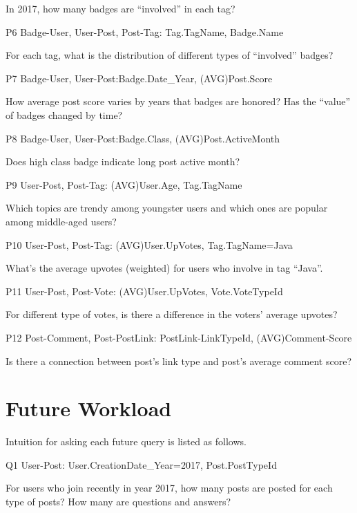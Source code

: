 \documentclass[letterpaper,12pt,titlepage,oneside,final]{book}
\begin{document}
In 2017, how many badges are ``involved'' in each tag? 

P6 \hspace{3mm} Badge-User, User-Post, Post-Tag: Tag.TagName, Badge.Name

For each tag, what is the distribution of different types of ``involved'' badges?

P7 \hspace{3mm} Badge-User, User-Post:Badge.Date\_Year, (AVG)Post.Score

How average post score varies by years that badges are honored? Has the ``value'' of badges changed by time? 

P8 \hspace{3mm} Badge-User, User-Post:Badge.Class, (AVG)Post.ActiveMonth

Does high class badge indicate long post active month?

P9 \hspace{3mm} User-Post, Post-Tag: (AVG)User.Age, Tag.TagName

Which topics are trendy among youngster users and which ones are popular among middle-aged users?

P10 \hspace{1.3mm} User-Post, Post-Tag: (AVG)User.UpVotes, Tag.TagName=Java

What's the average upvotes (weighted) for users who involve in tag ``Java''. 

P11 \hspace{1.3mm} User-Post, Post-Vote: (AVG)User.UpVotes, Vote.VoteTypeId

For different type of votes, is there a difference in the voters’ average upvotes? 

P12 \hspace{1.3mm} Post-Comment, Post-PostLink: PostLink-LinkTypeId, (AVG)Comment-Score

Is there a connection between post's link type and post's average comment score?

\section{Future Workload}

Intuition for asking each future query is listed as follows. 

Q1 \hspace{3mm} User-Post: User.CreationDate\_Year=2017, Post.PostTypeId

For users who join recently in year 2017, how many posts are posted for each type of posts? How many are questions and answers?
\end{document}
